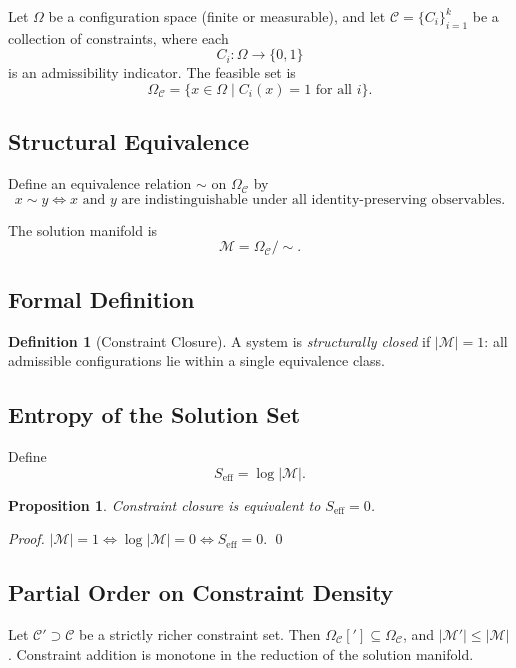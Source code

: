 \documentclass[12pt, twoside]{article}
\theoremstyle{plain}
\newtheorem{proposition}[theorem]{Proposition}
\theoremstyle{definition}
\newtheorem{definition}[theorem]{Definition}
\theoremstyle{remark}
\newcommand{\OmC}{\Omega_{\mathcal{C}}}
\newcommand{\Seff}{S_{\text{eff}}}
\begin{document}
Let $\Omega$ be a configuration space (finite or measurable), and let $\mathcal{C} = \{C_i\}_{i=1}^k$ be a collection of constraints, where each
\[
C_i : \Omega \to \{0,1\}
\]
is an admissibility indicator. The feasible set is
\[
\OmC = \{ x \in \Omega \mid C_i(x) = 1 \text{ for all } i \}.
\]

\subsection{Structural Equivalence}

Define an equivalence relation $\sim$ on $\OmC$ by
\[
x \sim y \iff x \text{ and } y \text{ are indistinguishable under all identity-preserving observables.}
\]

The solution manifold is
\[
\mathcal{M} = \OmC / {\sim}.
\]

\subsection{Formal Definition}

\begin{definition}[Constraint Closure]
A system is \emph{structurally closed} if $|\mathcal{M}| = 1$: all admissible configurations lie within a single equivalence class.
\end{definition}

\subsection{Entropy of the Solution Set}

Define
\[
\Seff = \log |\mathcal{M}|.
\]

\begin{proposition}
Constraint closure is equivalent to $\Seff = 0$.
\end{proposition}

\begin{proof}
$|\mathcal{M}| = 1 \iff \log |\mathcal{M}| = 0 \iff \Seff = 0$. \qed
\end{proof}

\subsection{Partial Order on Constraint Density}

Let $\mathcal{C}' \supset \mathcal{C}$ be a strictly richer constraint set. Then $\OmC['] \subseteq \OmC$, and $|\mathcal{M}'| \leq |\mathcal{M}|$. Constraint addition is monotone in the reduction of the solution manifold.
\end{document}
